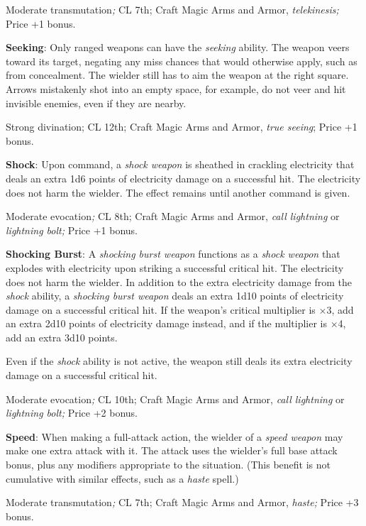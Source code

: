 Moderate transmutation\textit{; }CL 7th; Craft Magic Arms and Armor, \textit{telekinesis; }Price +1 bonus.
				
\textbf{Seeking}: Only ranged weapons can have the \textit{seeking }ability. The weapon veers toward its target, negating any miss chances that would otherwise apply, such as from concealment. The wielder still has to aim the weapon at the right square. Arrows mistakenly shot into an empty space, for example, do not veer and hit invisible enemies, even if they are nearby.
				
Strong divination; CL 12th; Craft Magic Arms and Armor, \textit{true seeing}; Price +1 bonus.
				
\textbf{Shock}: Upon command, a \textit{shock weapon} is sheathed in crackling electricity that deals an extra 1d6 points of electricity damage on a successful hit. The electricity does not harm the wielder. The effect remains until another command is given. 
				
Moderate evocation\textit{; }CL 8th; Craft Magic Arms and Armor, \textit{call lightning }or \textit{lightning bolt; }Price +1 bonus.
				
\textbf{Shocking Burst}: A \textit{shocking burst weapon} functions as a \textit{shock weapon} that explodes with electricity upon striking a successful critical hit. The electricity does not harm the wielder. In addition to the extra electricity damage from the \textit{shock} ability, a \textit{shocking burst weapon} deals an extra 1d10 points of electricity damage on a successful critical hit. If the weapon's critical multiplier is \mbox{$\times$}3, add an extra 2d10 points of electricity damage instead, and if the multiplier is \mbox{$\times$}4, add an extra 3d10 points.
				
Even if the \textit{shock} ability is not active, the weapon still deals its extra electricity damage on a successful critical hit.
				
Moderate evocation\textit{; }CL 10th; Craft Magic Arms and Armor, \textit{call lightning }or \textit{lightning bolt; }Price +2 bonus.
				
\textbf{Speed}: When making a full-attack action, the wielder of a \textit{speed weapon} may make one extra attack with it. The attack uses the wielder's full base attack bonus, plus any modifiers appropriate to the situation. (This benefit is not cumulative with similar effects, such as a \textit{haste }spell.)
				
Moderate transmutation\textit{; }CL 7th; Craft Magic Arms and Armor, \textit{haste; }Price +3 bonus.
				
